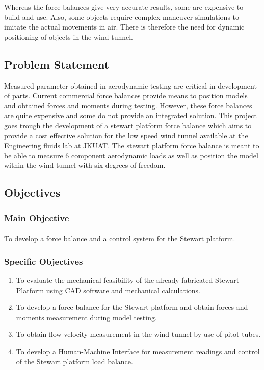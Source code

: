 Whereas the force balances give very accurate results, some are expensive to build and use. Also, some objects require complex maneuver simulations to imitate the actual movements in air. There is therefore the need for dynamic positioning of objects in the wind tunnel.
\subsection{Problem Statement}
Measured parameter obtained in aerodynamic testing are critical in development of parts. Current commercial force balances provide means to position models and obtained forces and moments during testing. 
However, these force balances are quite expensive and some do not provide an integrated solution. This project goes trough the development of a stewart platform force balance which aims to provide a cost effective solution for the low speed wind tunnel available at the Engineering fluids lab at JKUAT. 
The stewart platform force balance is meant to be able to measure 6 component aerodynamic loads as well as position the model within the wind tunnel with six degrees of freedom.
\subsection{Objectives}
\subsubsection{Main Objective}
\paragraph{} To develop a force balance and a control system for the Stewart platform. 
\subsubsection{Specific Objectives}
\begin{enumerate}
\item To evaluate the mechanical feasibility of the already fabricated Stewart Platform using CAD software and mechanical calculations.
\item To develop a force balance for the Stewart platform and obtain forces and moments measurement during model testing.
\item To obtain flow velocity measurement in the wind tunnel by use of pitot tubes.
\item To develop a Human-Machine Interface for measurement readings and control of the Stewart platform load balance.
\end{enumerate}
